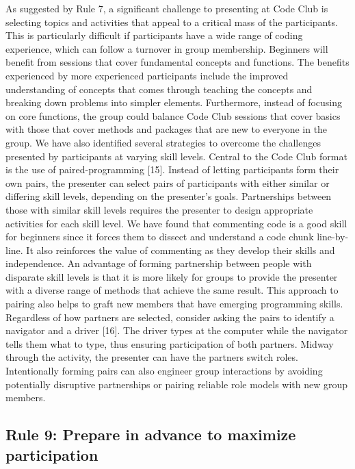 \documentclass[
  11pt,
]{article}
\begin{document}
As suggested by Rule 7, a significant challenge to presenting at Code
Club is selecting topics and activities that appeal to a critical mass
of the participants. This is particularly difficult if participants have
a wide range of coding experience, which can follow a turnover in group
membership. Beginners will benefit from sessions that cover fundamental
concepts and functions. The benefits experienced by more experienced
participants include the improved understanding of concepts that comes
through teaching the concepts and breaking down problems into simpler
elements. Furthermore, instead of focusing on core functions, the group
could balance Code Club sessions that cover basics with those that cover
methods and packages that are new to everyone in the group. We have also
identified several strategies to overcome the challenges presented by
participants at varying skill levels. Central to the Code Club format is
the use of paired-programming {[}15{]}. Instead of letting participants
form their own pairs, the presenter can select pairs of participants
with either similar or differing skill levels, depending on the
presenter's goals. Partnerships between those with similar skill levels
requires the presenter to design appropriate activities for each skill
level. We have found that commenting code is a good skill for beginners
since it forces them to dissect and understand a code chunk
line-by-line. It also reinforces the value of commenting as they develop
their skills and independence. An advantage of forming partnership
between people with disparate skill levels is that it is more likely for
groups to provide the presenter with a diverse range of methods that
achieve the same result. This approach to pairing also helps to graft
new members that have emerging programming skills. Regardless of how
partners are selected, consider asking the pairs to identify a navigator
and a driver {[}16{]}. The driver types at the computer while the
navigator tells them what to type, thus ensuring participation of both
partners. Midway through the activity, the presenter can have the
partners switch roles. Intentionally forming pairs can also engineer
group interactions by avoiding potentially disruptive partnerships or
pairing reliable role models with new group members.

\hypertarget{rule-9-prepare-in-advance-to-maximize-participation}{%
\subsection{Rule 9: Prepare in advance to maximize
participation}\label{rule-9-prepare-in-advance-to-maximize-participation}}
\end{document}
